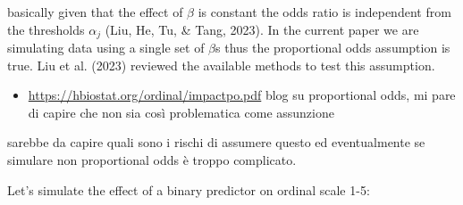 \documentclass[
  man,floatsintext]{apa6}
\newenvironment{Shaded}{\begin{snugshade}}{\end{snugshade}}
\newcommand{\AttributeTok}[1]{\textcolor[rgb]{0.13,0.29,0.53}{#1}}
\newcommand{\CommentTok}[1]{\textcolor[rgb]{0.56,0.35,0.01}{\textit{#1}}}
\newcommand{\DecValTok}[1]{\textcolor[rgb]{0.00,0.00,0.81}{#1}}
\newcommand{\FloatTok}[1]{\textcolor[rgb]{0.00,0.00,0.81}{#1}}
\newcommand{\FunctionTok}[1]{\textcolor[rgb]{0.13,0.29,0.53}{\textbf{#1}}}
\newcommand{\NormalTok}[1]{#1}
\newcommand{\OtherTok}[1]{\textcolor[rgb]{0.56,0.35,0.01}{#1}}
\newcommand{\SpecialCharTok}[1]{\textcolor[rgb]{0.81,0.36,0.00}{\textbf{#1}}}
\newcommand{\StringTok}[1]{\textcolor[rgb]{0.31,0.60,0.02}{#1}}
\providecommand{\tightlist}{%
  \setlength{\itemsep}{0pt}\setlength{\parskip}{0pt}}
\begin{document}
basically given that the effect of \(\beta\) is constant the odds ratio is independent from the thresholds \(\alpha_j\) (Liu, He, Tu, \& Tang, 2023). In the current paper we are simulating data using a single set of \(\beta\)s thus the proportional odds assumption is true. Liu et al. (2023) reviewed the available methods to test this assumption.

\begin{itemize}
\tightlist
\item
  \url{https://hbiostat.org/ordinal/impactpo.pdf} blog su proportional odds, mi pare di capire che non sia così problematica come assunzione
\end{itemize}

sarebbe da capire quali sono i rischi di assumere questo ed eventualmente se simulare non proportional odds è troppo complicato.

Let's simulate the effect of a binary predictor on ordinal scale 1-5:

\begin{Shaded}
\end{Shaded}
\end{document}
